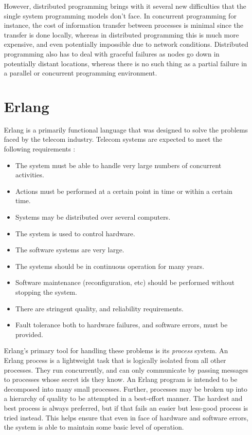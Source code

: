 \documentclass[10pt,a4paper,twocolumn]{article}
\begin{document}
However, distributed programming brings with it several new difficulties that
the single system programming models don't face. In concurrent programming for
instance, the cost of information transfer between processes is minimal since
the transfer is done locally, whereas in distributed programming this is much
more expensive, and even potentially impossible due to network conditions.
Distributed programming also has to deal with graceful failures as nodes go down
in potentially distant locations, whereas there is no such thing as a partial
failure in a parallel or concurrent programming environment. 

\section{Erlang}

Erlang is a primarily functional language that was designed to solve the
problems faced by the telecom industry. Telecom systems are expected to meet the
following requirements \cite{dacker2000concurrent}:

\begin{itemize}
    \item The system must be able to handle very large numbers of concurrent activities.
    \item Actions must be performed at a certain point in time or within a certain time.
    \item Systems may be distributed over several computers.
    \item The system is used to control hardware.
    \item The software systems are very large.
    \item The systems should be in continuous operation for many years.
    \item Software maintenance (reconfiguration, etc) should be performed without stopping the system.
    \item There are stringent quality, and reliability requirements.
    \item Fault tolerance both to hardware failures, and software errors, must be provided.
\end{itemize}

Erlang's primary tool for handling these problems is its \emph{process} system.
\cite{erlangthesis} An Erlang process is a lightweight task that is logically
isolated from all other processes. They run concurrently, and can only
communicate by passing messages to processes whose secret ids they know. An
Erlang program is intended to be decomposed into many small processes. Further,
processes may be broken up into a hierarchy of quality to be attempted in a
best-effort manner. The hardest and best process is always preferred, but if
that fails an easier but less-good process is tried instead. This helps ensure
that even in face of hardware and software errors, the system is able to
maintain some basic level of operation.
\end{document}
